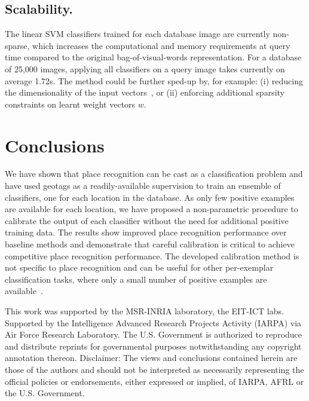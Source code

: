    \subsection{Scalability.}
      The linear SVM classifiers trained for each database image are currently non-sparse,
      which increases the computational and memory requirements
      at query time compared to the original bag-of-visual-words representation.
      For a database of 25,000 images, applying all classifiers on a query image takes currently on average 1.72s. The method could be further sped-up by, for example: (i) reducing the dimensionality of the input vectors~\cite{Jegou12}, or (ii) enforcing additional sparsity constraints on learnt weight vectors $w$.

   
\section{Conclusions}
   We have shown that place recognition can be cast as a classification problem and have used geotags as a readily-available supervision to train an ensemble of classifiers, one for each location in the database. As only few positive examples are available for each location, we have proposed a non-parametric procedure to calibrate the output of each classifier without the need for additional positive training data. The results show improved place recognition performance over baseline methods and demonstrate that careful calibration is critical to achieve competitive place recognition performance. The developed calibration method is not specific to place recognition and can be useful for other per-exemplar classification tasks, where only a small number of positive examples are available~\cite{Malisiewicz11}.

   \vspace*{-3mm}


\begin{acknowledgements}
   This work was supported by the MSR-INRIA laboratory, the EIT-ICT labs.
   {
   \footnotesize
   \noindent
   Supported by the Intelligence Advanced Research Projects Activity (IARPA) via Air Force Research Laboratory. The U.S. Government is authorized to reproduce and distribute reprints for governmental purposes notwithstanding any copyright annotation thereon. Disclaimer:  The views and conclusions contained herein are those of the authors and should not be interpreted as necessarily representing the official policies or endorsements, either expressed or implied, of IARPA, AFRL or the U.S. Government.
   }
\end{acknowledgements}

